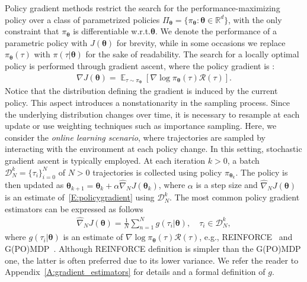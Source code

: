 \documentclass{article}
\makeatletter
\theoremstyle{remark}
\theoremstyle{definition}
\DeclareRobustCommand{\eg}{e.g.,\@\xspace}
\DeclareRobustCommand{\wrt}{w.r.t.\@\xspace}
\newcommand{\realspace}{\mathbb R}      %
\DeclareMathOperator*{\EV}{\mathbb{E}}
\newcommand{\EVV}[2][\ppvect \in \ppspace]{\EV_{#1}\left[{#2}\right]}
\newcommand{\de}{\,\mathrm{d}}
\newcommand{\vtheta}{\boldsymbol{\theta}}
\newcommand{\Tspace}{\mathcal{T}}
\newcommand{\Reward}{\mathcal{R}}
\newcommand{\pol}{\pi_{\vtheta}}
\newcommand{\score}[2]{\nabla\log\pi_{#1}(#2)}
\newcommand{\gradJ}[1]{\nabla J(#1)}
\newcommand{\gradApp}[2]{\widehat{\nabla}_{#2}J(#1)}
\makeatother
\begin{document}
Policy gradient methods restrict the search for the performance-maximizing policy over a class of parametrized policies $\Pi_{\vtheta}=\{\pol: \vtheta \in \realspace^d\}$, with the only constraint that $\pol$ is differentiable \wrt $\vtheta$. We denote the performance of a parametric policy with $J(\vtheta)$ for brevity, while in some occasions we replace $\pol(\tau)$ with $\pi(\tau|\vtheta)$ for the sake of readability.
The search for a locally optimal policy is performed through gradient ascent, where the policy gradient
is \cite{sutton2000policy, Peters2008reinf}:
\begin{align} \label{E:policygradient}
        \gradJ{\vtheta} = \EVV[\tau \sim \pol]{\score{\vtheta}{\tau}\Reward(\tau)}.
\end{align}
Notice that the distribution defining the gradient is induced by the current policy. This aspect introduces a nonstationarity in the sampling process. Since the underlying distribution changes over time, it is necessary to resample at each update or use weighting techniques such as importance sampling.
Here, we consider the \emph{online learning scenario}, where trajectories are sampled by interacting with the environment at each policy change. 
In this setting, stochastic gradient ascent is typically employed.
At each iteration $k >0$, a batch $\mathcal{D}_N^k = \{\tau_i\}_{i=0}^N$ of $N>0$ trajectories is collected using policy $\pi_{\vtheta_k}$.
The policy is then updated as $\vtheta_{k+1}  = \vtheta_k + \alpha\gradApp{\vtheta_k}{N}$, where $\alpha$ is a step size and $\gradApp{\vtheta}{N}$ is an estimate of~\eqref{E:policygradient} using $\mathcal{D}_N^k$. The most common policy gradient estimators can be expressed as follows
\begin{align} \label{E:policygradient.estimate}
        \gradApp{\vtheta}{N} = \frac{1}{N}\sum_{n=1}^{N} g(\tau_i|\vtheta), \quad \tau_i \in \mathcal{D}_N^k,
\end{align}
where $g(\tau_i|\vtheta)$ is an estimate of $\score{\vtheta}{\tau}\Reward(\tau)$, \eg REINFORCE~\citep{williams1992simple} and G(PO)MDP~\citep{baxter2001infinite}.
Although REINFORCE definition is simpler than the G(PO)MDP one, the latter is often preferred due to its lower variance.
We refer the reader to Appendix~\ref{A:gradient_estimators} for details and a formal definition of $g$.
\end{document}
